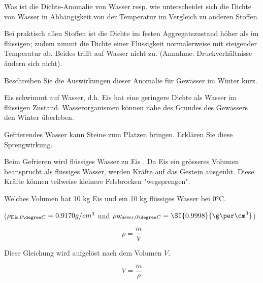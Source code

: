 \begin{questions}
    \question
    Was ist die Dichte-Anomalie von Wasser resp. wie unterscheidet sich die Dichte von Wasser in Abhängigkeit von der Temperatur im Vergleich zu anderen Stoffen.


    \begin{solution}
        Bei praktisch allen Stoffen ist die Dichte im festen Aggregatszustand höher als im flüssigen; zudem nimmt die Dichte einer Flüssigkeit normalerweise mit steigender Temperatur ab.
        Beides trifft auf Wasser nicht zu.
        (Annahme: Druckverhältnisse ändern sich nicht).
    \end{solution}


    \question
    Beschreiben Sie die Auswirkungen dieser Anomalie für Gewässer im Winter  kurz.

    \begin{solution}
        Eis schwimmt auf Wasser, d.h. Eis hat eine geringere Dichte als Wasser im flüssigen Zustand.
        Wasserorganismen können nahe des Grundes des Gewässers den Winter überleben.
    \end{solution}

    \question
    Gefrierendes Wasser kann Steine zum Platzen bringen. Erklären Sie diese Sprengwirkung.

    \begin{solution}
        Beim Gefrieren wird flüssiges Wasser zu Eis . Da Eis ein grösseres Volumen beansprucht als flüssiges Wasser, werden Kräfte auf das Gestein ausgeübt. Diese Kräfte können teilweise kleinere Felsbrocken "wegsprengen".
    \end{solution}


    \question
    Welches Volumen hat 10 kg Eis und ein 10 kg flüssiges Wasser bei 0°C.

    ($\rho_{\text{Eis,} 0\degree C}=0.9170 g/cm^3$ und $\rho_{\text{Wasser,} 0\degree C}= \SI{0.9998}{\g\per\cm^3}$)



    \begin{solution}
        \begin{equation}
            \rho = \dfrac{m}{V}
        \end{equation}

        Diese Gleichung wird aufgelöst nach dem Volumen $V$.

        \begin{equation*}
            V = \dfrac{m}{\rho}
        \end{equation*}


\end{solution}
\end{questions}
